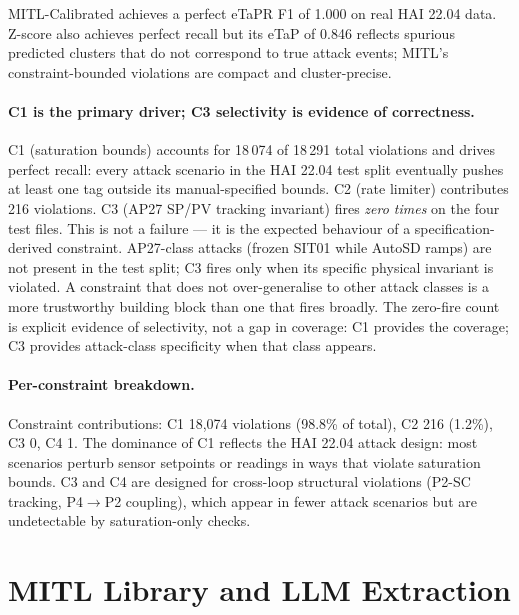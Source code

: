 \documentclass[sigconf,anonymous,review]{acmart}
\begin{document}
MITL-Calibrated achieves a perfect eTaPR F1 of 1.000 on real HAI 22.04 data.
Z-score also achieves perfect recall but its eTaP of 0.846 reflects spurious
predicted clusters that do not correspond to true attack events; MITL's
constraint-bounded violations are compact and cluster-precise.

\paragraph{C1 is the primary driver; C3 selectivity is evidence of correctness.}
C1 (saturation bounds) accounts for 18\,074 of 18\,291 total violations and
drives perfect recall: every attack scenario in the HAI 22.04 test split
eventually pushes at least one tag outside its manual-specified bounds.
C2 (rate limiter) contributes 216 violations.
C3 (AP27 SP/PV tracking invariant) fires \emph{zero times} on the four test files.
This is not a failure — it is the expected behaviour of a specification-derived
constraint.  AP27-class attacks (frozen SIT01 while AutoSD ramps) are not
present in the test split; C3 fires only when its specific physical invariant is
violated.  A constraint that does not over-generalise to other attack classes is
a more trustworthy building block than one that fires broadly.  The zero-fire
count is explicit evidence of selectivity, not a gap in coverage: C1 provides
the coverage; C3 provides attack-class specificity when that class appears.

\paragraph{Per-constraint breakdown.}
Constraint contributions: C1 18,074 violations (98.8\% of total), C2 216
(1.2\%), C3 0, C4 1.  The dominance of C1 reflects the HAI 22.04 attack
design: most scenarios perturb sensor setpoints or readings in ways that
violate saturation bounds.  C3 and C4 are designed for cross-loop structural
violations (P2-SC tracking, P4$\to$P2 coupling), which appear in fewer attack
scenarios but are undetectable by saturation-only checks.

\section{MITL Library and LLM Extraction}
\label{sec:library}
\end{document}
